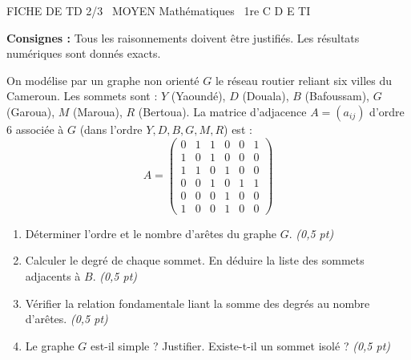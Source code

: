 \documentclass[11pt]{article}
\begin{document}
\begin{tcolorbox}[enhanced,colback=popink,colframe=popink,arc=10pt,boxrule=0pt,left=12pt,right=12pt,top=9pt,bottom=9pt]
{\color{white}\popxbold\small FICHE DE TD 2/3 \textbullet\ MOYEN \hfill Mathématiques \textbullet\ 1re C D E TI\par}
\end{tcolorbox}
\vspace{4pt}
\noindent \textbf{Consignes :} Tous les raisonnements doivent être justifiés. Les résultats numériques sont donnés exacts.

\begin{exercice}
On modélise par un graphe non orienté $G$ le réseau routier reliant six villes du Cameroun. Les sommets sont : $Y$ (Yaoundé), $D$ (Douala), $B$ (Bafoussam), $G$ (Garoua), $M$ (Maroua), $R$ (Bertoua). La matrice d'adjacence $A = (a_{ij})$ d'ordre 6 associée à $G$ (dans l'ordre $Y, D, B, G, M, R$) est :
\[
A = \begin{pmatrix}
0 & 1 & 1 & 0 & 0 & 1 \\
1 & 0 & 1 & 0 & 0 & 0 \\
1 & 1 & 0 & 1 & 0 & 0 \\
0 & 0 & 1 & 0 & 1 & 1 \\
0 & 0 & 0 & 1 & 0 & 0 \\
1 & 0 & 0 & 1 & 0 & 0
\end{pmatrix}
\]
\begin{enumerate}
    \item Déterminer l'ordre et le nombre d'arêtes du graphe $G$. \textit{(0,5 pt)}
    \item Calculer le degré de chaque sommet. En déduire la liste des sommets adjacents à $B$. \textit{(0,5 pt)}
    \item Vérifier la relation fondamentale liant la somme des degrés au nombre d'arêtes. \textit{(0,5 pt)}
    \item Le graphe $G$ est-il simple ? Justifier. Existe-t-il un sommet isolé ? \textit{(0,5 pt)}
\end{enumerate}
\end{exercice}
\end{document}
